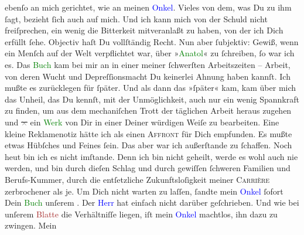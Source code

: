\documentclass[twoside=false,titlepage=false,open=any, parskip=never, fontsize=12pt, headings=small, chapterprefix=false, appendixprefix=false]{scrbook}
\newcommand{\strikeout}[1]{\sout{#1}}
\newcommand{\pbposition}{\depth}
\newcommand{\pb}{\nobreak\hspace{0pt}\raisebox{-0.1em}{\raisebox{\pbposition}{\textnormal{|}}}\nobreak\hspace{0pt}}
\begin{document}
                  {\pb}ebenſo an mich gerichtet, wie an meinen \textcolor{blue}{Onkel}{}. Vieles von dem, was Du
               zu ihm ſagt, bezieht ſich auch auf mich. Und ich kann mich von der Schuld nicht
               freiſprechen, ein wenig die Bitterkeit mitveranlaßt zu haben, von der ich Dich
               erfüllt ſehe. Objectiv haſt Du vollſtändig Recht. Nun aber ſubjektiv: Gewiß, wenn ein
               Menſch auf der Welt verpflichtet war, über »\textcolor{green}{Anatol}{}\ledrightnote{\textcolor{green}{Anatol}}« zu ſchreiben, ſo war ich es. Das \textcolor{green}{Buch}{} kam bei mir an in einer meiner ſchwerſten Arbeitszeiten
               – Arbeit, von deren Wucht und Depreſ{\pb}ſionsmacht Du
               keinerlei Ahnung haben kannſt. Ich mußte es zurücklegen für ſpäter. Und als dann das
               »ſpäter« kam, kam über mich das Unheil, das Du kennſt, mit der Unmöglichkeit, auch
               nur ein wenig Spannkraft zu finden, um aus dem mechaniſchen Trott der täglichen
               Arbeit heraus zugehen und \strikeout{\textcolor{gray}{×}} ein \textcolor{green}{Werk}{} von Dir in
               einer Deiner würdigen Weiſe zu bearbeiten. Eine kleine Reklamenotiz hätte ich als
               einen \textsc{Affront} für Dich empfunden. Es mußte etwas Hübſches
               und Feines {\pb}ſein. Das aber war ich außerſtande zu
               ſchaffen. Noch heut bin ich es nicht imſtande. Denn
               ich bin nicht geheilt, werde es wohl auch nie werden, und bin durch dieſen Schlag und
               durch gewiſſen ſchweren Familien und Berufs-Kummer, durch die entſetzliche
               Zukunftsloſigkeit meiner \textsc{Carrière} zerbrochener als je. Um
               Dich nicht warten zu laſſen, ſandte mein \textcolor{blue}{Onkel}{} ſofort Dein \textcolor{green}{Buch}{} unſerem \label{K_L02709-5v}\label{K_L02709-5h}. Der \textcolor{blue}{Herr}{} hat einfach nicht darüber geſchrieben. Und wie {\pb}bei unſerem \textcolor{brown}{Blatte}{} die Verhältniſſe liegen, iſt mein \textcolor{blue}{Onkel}{} machtlos, ihn dazu zu zwingen. Mein
\end{document}
